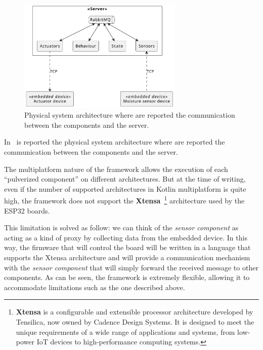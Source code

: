 \begin{figure}
	\centering
	\includegraphics[width=0.7\textwidth]{figures/demo1-physical.pdf}
	\caption{Physical system architecture where are reported the communication between the components and the server.}
	\label{fig:demo-1-physical-system}
\end{figure}

In~ is reported the physical system architecture where are reported the communication between the components and the
server.

The multiplatform nature of the framework allows the execution of each ``pulverized component'' on different architectures.
But at the time of writing, even if the number of supported architectures in Kotlin multiplatform is quite high, the framework does not support the
\textbf{Xtensa}~\footnote{\textbf{Xtensa} is a configurable and extensible processor architecture developed by Tensilica, now owned by Cadence Design Systems. It is designed to meet the unique requirements of a wide range of applications and systems, from low-power IoT devices to high-performance computing systems.}
architecture used by the ESP32 boards.

This limitation is solved as follow: we can think of the \emph{sensor component} as acting as a kind of proxy by collecting data from
the embedded device. In this way, the firmware that will control the board will be written in a language that supports the Xtensa architecture and
will provide a communication mechanism with the \emph{sensor component} that will simply forward the received message to other components.
As can be seen, the framework is extremely flexible, allowing it to accommodate limitations such as the one described above.

